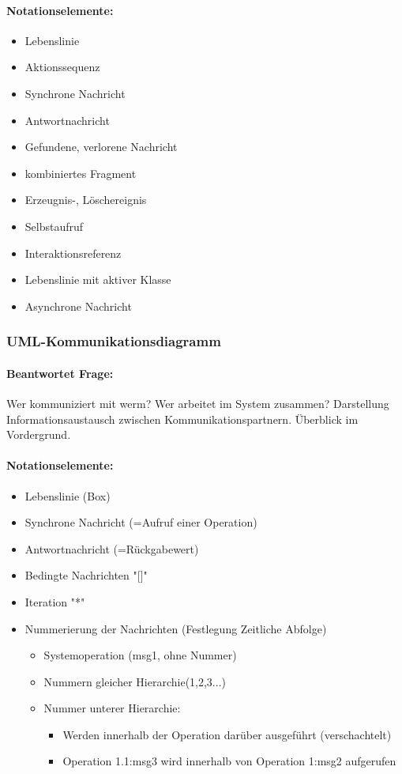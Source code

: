 \documentclass[../ZF_SWEN1.tex]{subfiles}
\begin{document}
\paragraph{Notationselemente:}
\begin{itemize}
	\item Lebenslinie
	\item Aktionssequenz
	\item Synchrone Nachricht
	\item Antwortnachricht
	\item Gefundene, verlorene Nachricht
	\item kombiniertes Fragment
	\item Erzeugnis-, Löschereignis
	\item Selbstaufruf
	\item Interaktionsreferenz
	\item Lebenslinie mit aktiver Klasse
	\item Asynchrone Nachricht
\end{itemize}
\subsubsection{UML-Kommunikationsdiagramm}
\paragraph{Beantwortet Frage:\\}
Wer kommuniziert mit werm? Wer arbeitet im System zusammen? Darstellung Informationsaustausch zwischen Kommunikationspartnern. Überblick im Vordergrund.
\paragraph{Notationselemente:}
\begin{itemize}
	\item Lebenslinie (Box)
	\item Synchrone Nachricht (=Aufruf einer Operation)
	\item Antwortnachricht (=Rückgabewert)
	\item Bedingte Nachrichten "[]"
	\item Iteration "*"
	\item Nummerierung der Nachrichten (Festlegung Zeitliche Abfolge)
	\begin{itemize}
		\item Systemoperation (msg1, ohne Nummer)
		\item Nummern gleicher Hierarchie(1,2,3...)
		\item Nummer unterer Hierarchie:
		\begin{itemize}
			\item Werden innerhalb der Operation darüber ausgeführt (verschachtelt)
			\item Operation 1.1:msg3 wird innerhalb von Operation 1:msg2 aufgerufen
		\end{itemize}
	\end{itemize}

\end{itemize}
\end{document}
